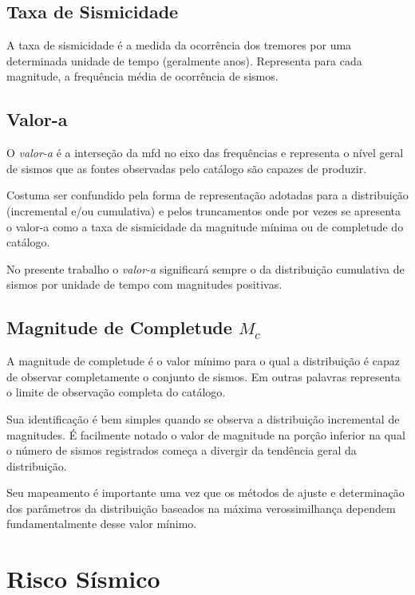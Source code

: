 \subsection{Taxa de Sismicidade}
\label{sec:seismic_rate}

A taxa de sismicidade é a medida da ocorrência dos tremores por uma determinada unidade de tempo (geralmente anos).
Representa para cada magnitude, a frequência média de ocorrência de sismos.

\subsection{Valor-a}
\label{sec:a_value}

O \emph{valor-a} é a interseção da \gls{mfd} no eixo das frequências e representa o nível geral de sismos
que as fontes observadas pelo catálogo são capazes de produzir.

Costuma ser confundido pela forma de representação adotadas para a distribuição (incremental e/ou
cumulativa) e pelos truncamentos onde por vezes se apresenta o valor-a como a taxa de sismicidade da 
magnitude mínima ou de completude do catálogo.

No presente trabalho o \emph{valor-a} significará sempre o da distribuição cumulativa de sismos por unidade de
tempo com magnitudes positivas.

\subsection{Magnitude de Completude $M_c$}
\label{sec:completeness}

A magnitude de completude é o valor mínimo para o qual a distribuição é capaz de observar completamente o conjunto
de sismos. Em outras palavras representa o limite de observação completa do catálogo.

Sua identificação é bem simples quando se observa a distribuição incremental de magnitudes. É facilmente notado o valor
de magnitude na porção inferior na qual o número de sismos registrados começa a divergir da tendência geral da
distribuição.

Seu mapeamento é importante uma vez que os métodos de ajuste e determinação dos parâmetros da distribuição baseados na
máxima verossimilhança \citep{aki_1965, weichert_1980} dependem fundamentalmente desse valor mínimo.


\section{Risco Sísmico}
\label{sec:risco_sismico}

